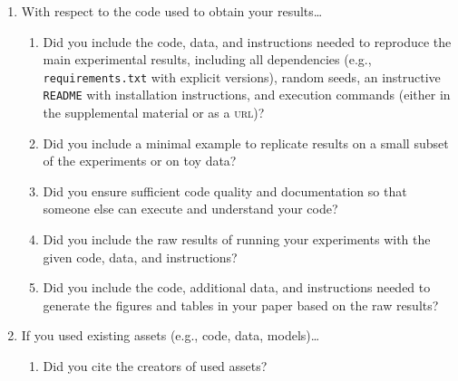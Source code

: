 \documentclass[11pt]{article}
\begin{document}
\begin{enumerate}
\begin{enumerate}
  \end{enumerate}
\item With respect to the code used to obtain your results\dots
  \begin{enumerate}
\item Did you include the code, data, and instructions needed to reproduce the
    main experimental results, including all dependencies (e.g.,
    \texttt{requirements.txt} with explicit versions), random seeds, an instructive
    \texttt{README} with installation instructions, and execution commands
    (either in the supplemental material or as a \textsc{url})?
  \item Did you include a minimal example to replicate results on a small subset
    of the experiments or on toy data?
  \item Did you ensure sufficient code quality and documentation so that someone else
    can execute and understand your code?
  \item Did you include the raw results of running your experiments with the given
    code, data, and instructions?
  \item Did you include the code, additional data, and instructions needed to generate
    the figures and tables in your paper based on the raw results?
  \end{enumerate}
\item If you used existing assets (e.g., code, data, models)\dots
  \begin{enumerate}
  \item Did you cite the creators of used assets?

\end{enumerate}
\end{enumerate}
\end{document}
